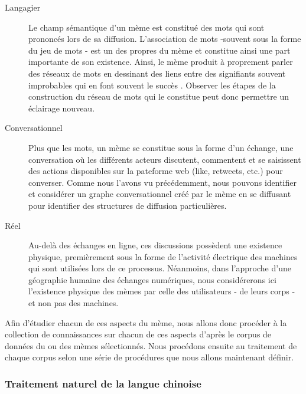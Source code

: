     \begin{description}
        \item[Langagier]
        Le champ sémantique d{\textquoteright}un mème est constitué des mots qui sont prononcés lors de sa diffusion. L{\textquoteright}association de mots -souvent sous la forme du jeu de mots - est un des propres du mème et constitue ainsi une part importante de son existence. Ainsi, le mème produit à proprement parler des réseaux de mots en dessinant des liens entre des signifiants souvent improbables qui en font souvent le succès \citep{Bauckhage2011}. Observer les étapes de la construction du réseau de mots qui le constitue peut donc permettre un éclairage nouveau.

        \item[Conversationnel] 
        Plus que les mots, un mème se constitue sous la forme d{\textquoteright}un échange, une conversation o\`u les différents acteurs discutent, commentent et se saisissent des actions disponibles sur la pateforme web (like, retweets, etc.) pour converser. Comme nous l{\textquoteright}avons vu précédemment, nous pouvons identifier et considérer un graphe conversationnel créé par le mème en se diffusant pour identifier des structures de diffusion particulières. 

        \item[Réel] 
        Au-delà des échanges en ligne, ces discussions possèdent une existence physique, premièrement sous la forme de l{\textquoteright}activité électrique des machines qui sont utilisées lors de ce processus. Néanmoins, dans l{\textquoteright}approche d{\textquoteright}une géographie humaine des échanges numériques, nous considérerons ici l{\textquoteright}existence physique des mèmes par celle des utilisateurs - de leurs corps - et non pas des machines. 
    \end{description}

    Afin d{\textquoteright}étudier chacun de ces aspects du mème, nous allons donc procéder à la collection de connaissances sur chacun de ces aspects d'après le corpus de données du ou des mèmes sélectionnés. Nous procédons ensuite au traitement de chaque corpus selon une série de procédures que nous allons maintenant définir. 

\subsubsection[Traitement naturel de la langue chinoise]{Traitement naturel de la langue chinoise}


